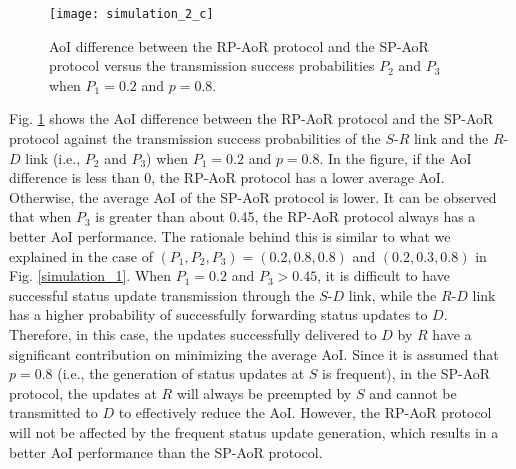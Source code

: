 \documentclass{IEEEtran}
\begin{document}
\begin{figure}
	\centering
	\texttt{[image: simulation\_2\_c]}
	\caption{AoI difference between the RP-AoR protocol and the SP-AoR protocol versus the transmission success probabilities $P_2$ and $P_3$ when $P_1=0.2$ and $p=0.8$.}
	\label{simulation_2}
	\vspace{-1cm}
\end{figure}

Fig. \ref{simulation_2} shows the AoI difference between the RP-AoR protocol and the SP-AoR protocol against the transmission success probabilities of the $S$-$R$ link and the $R$-$D$ link (i.e., $P_2$ and $P_3$) when $P_1=0.2$ and $p=0.8$. In the figure, if the AoI difference is less than 0, the RP-AoR protocol has a lower average AoI. Otherwise, the average AoI of the SP-AoR protocol is lower. It can be observed that when $P_3$ is greater than about 0.45, the RP-AoR protocol always has a better AoI performance. The rationale behind this is similar to what we explained in the case of $(P_1,P_2,P_3)=(0.2,0.8,0.8)$ and $(0.2,0.3,0.8)$ in Fig. \ref{simulation_1}. When $P_1=0.2$ and $P_3>0.45$, it is difficult to have successful status update transmission through the $S$-$D$ link, while the $R$-$D$ link has a higher probability of successfully forwarding status updates to $D$. Therefore, in this case, the updates successfully delivered to $D$ by $R$ have a significant contribution on minimizing the average AoI. Since it is assumed that $p=0.8$ (i.e., the generation of status updates at $S$ is frequent), in the SP-AoR protocol, the updates at $R$ will always be preempted by $S$ and cannot be transmitted to $D$ to effectively reduce the AoI. However, the RP-AoR protocol will not be affected by the frequent status update generation, which results in a better AoI performance than the SP-AoR protocol. 

\end{document}
